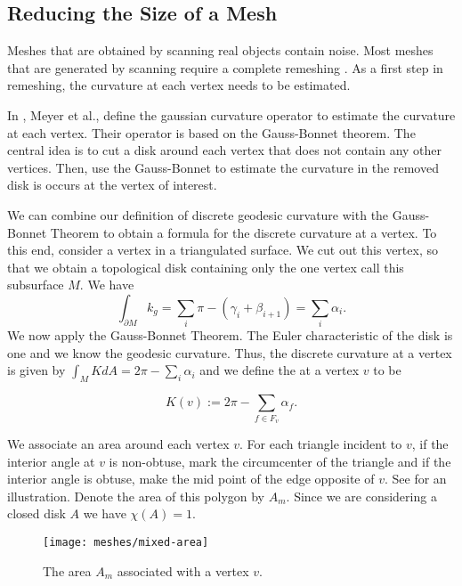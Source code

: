\subsection{Reducing the Size of a Mesh}
\label{sec:removing}


Meshes that are obtained by scanning real objects contain noise.
Most meshes that are generated by scanning require a complete
remeshing \cite{remeshing-2003}.
As a first step in remeshing, the curvature at each
vertex needs to be estimated.

In \cite{mmsb-2003}, Meyer et al., define the gaussian curvature operator
to estimate the curvature at each vertex. Their operator is 
based on the Gauss-Bonnet theorem.
The central idea is to cut a disk around each vertex that does not contain
any other vertices. Then, use the Gauss-Bonnet
to estimate the curvature in the removed
disk is occurs at the vertex of interest.

We can combine our definition of discrete geodesic curvature
with the Gauss-Bonnet Theorem to obtain a formula for the discrete
curvature at a vertex.
To this end, consider a vertex in a triangulated surface.
We cut out this vertex, so that we obtain a topological disk containing
only the one vertex call this subsurface $M$. We have
$$\int_{\partial M}k_g=\sum_i\pi -(\gamma_i+\beta_{i+1})=\sum_i\alpha_i.$$
We now apply the Gauss-Bonnet Theorem.
The Euler characteristic of the disk is one and we know the geodesic curvature.
Thus, the discrete curvature at a vertex is given by
$\int_M K dA=2\pi-\sum_i\alpha_i$ and we define
the  at a vertex $v$ to be

\begin{equation} \label{eqn:discrete-gaussian}
K(v):=2\pi -\sum_{f\in F_v}\alpha_f.
\end{equation}


We associate an area around each vertex $v$. 
For each triangle incident to $v$, if the interior 
angle at $v$ is non-obtuse, mark the circumcenter of the triangle
and if the interior angle is obtuse, make the mid point of the edge
opposite of $v$. See  for an illustration.
Denote the area of this polygon by $A_m.$
Since we are considering a closed disk $A$ we have $\chi(A)=1$.


\begin{figure}[htb]
\centering
\texttt{[image: meshes/mixed-area]}
\caption{The area $A_m$ associated with a vertex $v$.}
\label{fig:mixed-area}
\end{figure}


